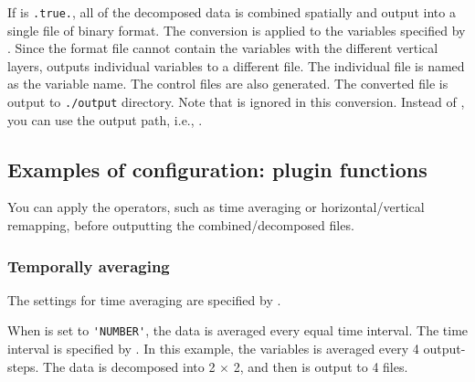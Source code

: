 If  is \verb|.true.|, all of the decomposed data is combined spatially
and output into a single file of \grads binary format.
The conversion is applied to the variables specified by .
Since the \grads format file cannot contain the variables with the different vertical layers,
\sno outputs individual variables to a different file.
The individual file is named as the variable name.
The control files are also generated.
The converted file is output to \verb|./output| directory.
Note that  is ignored in this conversion.
Instead of , you can use the output path, i.e., .



\subsection{Examples of configuration: plugin functions}

You can apply the operators, such as time averaging or horizontal/vertical remapping,
before outputting the combined/decomposed files.

\subsubsection{Temporally averaging}

The settings for time averaging are specified by .
%

When  is set to \verb|'NUMBER'|, the data is averaged every equal time interval.
The time interval is specified by .
In this example, the variables is averaged every 4 output-steps.
The data is decomposed into 2 $\times$ 2, and then is output to 4 files.


